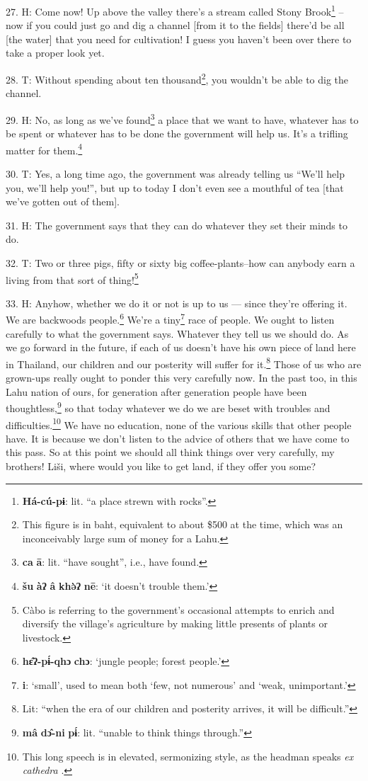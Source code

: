 27. H: Come now! Up above the valley there's a stream called Stony Brook\footnote{\textbf{Há-cú-pɨ}: lit. ``a place strewn with rocks''.} --
now if you could just go and dig a channel [from it to the fields] there'd be all
[the water] that you need for cultivation! I guess you haven't been over there
to take a proper look yet.

28. T: Without spending about ten thousand\footnote{This figure is in baht, equivalent to about \$500 at the time, which was an inconceivably large sum of money for a Lahu.}, you wouldn't be able to dig
the channel.

29. H: No, as long as we've found\footnote{\textbf{ca} \textbf{ā}: lit. ``have sought'', i.e., have found.} a place that we want to have, whatever has
to be spent or whatever has to be done the government will help us. It's a trifling
matter for them.\footnote{\textbf{šu} \textbf{àʔ} \textbf{â} \textbf{khə̀ʔ} \textbf{nē}: `it doesn't trouble them.'}

30. T: Yes, a long time ago, the government was already telling us ``We'll
help you, we'll help you!'', but up to today I don't even see a mouthful of tea
[that we've gotten out of them].

31. H: The government says that they can do whatever they set their minds to do.

32. T: Two or three pigs, fifty or sixty big coffee-plants--how can anybody
earn a living from that sort of thing!\footnote{Càbo is referring to the government's occasional attempts to enrich and diversify the village's agriculture by making little presents of plants or livestock.}

33. H: Anyhow, whether we do it or not is up to us --- since they're offering it.
We are backwoods people.\footnote{\textbf{hɛ̂ʔ-pɨ́-qhɔ} \textbf{chɔ}: `jungle people; forest people.'} We're a tiny\footnote{\textbf{i}: `small', used to mean both `few, not numerous' and `weak, unimportant.'} race of people. We ought to listen
carefully to what the government says. Whatever they tell us we should do. As we
go forward in the future, if each of us doesn't have his own piece of land here
in Thailand, our children and our posterity will suffer for it.\footnote{Lit: ``when the era of our children and posterity arrives, it will be difficult.''} Those of us
who are grown-ups really ought to ponder this very carefully now. In the past too,
in this Lahu nation of ours, for generation after generation people have been thoughtless,\footnote{\textbf{mâ} \textbf{dɔ̂-ni} \textbf{pɨ́}: lit. ``unable to think things through.''}
so that today whatever we do we are beset with troubles and difficulties.\footnote{This long speech is in elevated, sermonizing style, as the headman speaks \textit{ex cathedra }.} We
have no education, none of the various skills that other people have. It is because
we don't listen to the advice of others that we have come to this pass. So at this
point we should all think things over very carefully, my brothers! Liši, where
would you like to get land, if they offer you some?

